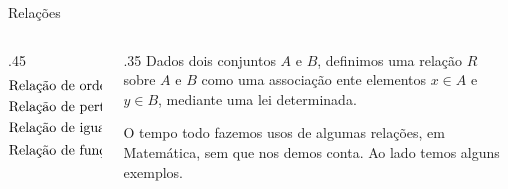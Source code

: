 \documentclass[aspectratio=169, t, 8pt]{beamer}
\begin{document}
    \begin{frame}{Relações}
        \begin{columns}[totalwidth=.9\textwidth, T]
            \begin{column}{.45\textwidth}
                {\Large                    
                    \[
                        \begin{aligned}
                            &\text{Relação de ordem: } a \leq b\\
                            \vspace{1.2em}
                            &\text{Relação de pertencimento: } a \in A\\
                            \vspace{1.2em}
                            &\text{Relação de igualdade: } a = b\\
                            \vspace{1.2em}
                            &\text{Relação de função:} \; f(x): y=ax^2 +3 
                        \end{aligned}
                    \]
                }
            \end{column}

            \begin{column}{.35\textwidth}
                Dados dois conjuntos $A$ e $B$, definimos uma relação $R$ sobre $A$ e $B$ como uma associação ente elementos $x \in A$ e $y \in B$, mediante uma lei determinada.

                \vspace{1.em}

                O tempo todo fazemos usos de algumas relações, em Matemática, sem que nos demos conta. Ao lado temos alguns exemplos.
            \end{column}
        \end{columns}
    \end{frame}
\end{document}
